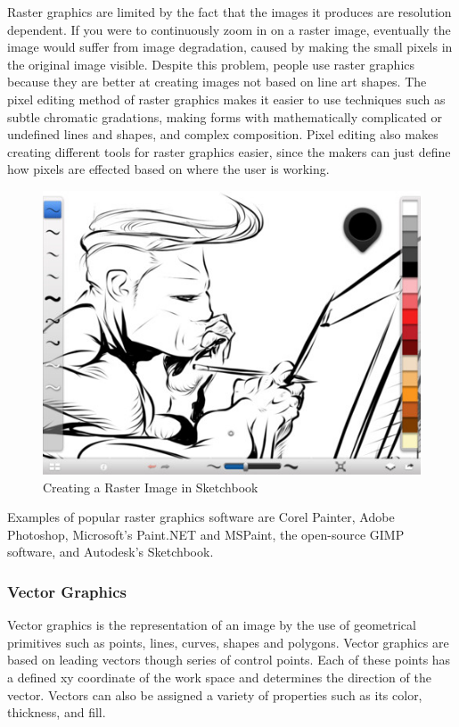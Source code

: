 \documentclass[12pt]{article}
\begin{document}
Raster graphics are limited by the fact that the images it produces are resolution dependent. 
If you were to continuously zoom in on a raster image, eventually the image would suffer from image degradation, caused by making the small pixels in the original image visible.
Despite this problem, people use raster graphics because they are better at creating images not based on line art shapes. 
The pixel editing method of raster graphics makes it easier to use techniques such as subtle chromatic gradations, making forms with mathematically complicated or undefined lines and shapes, and complex composition. 
Pixel editing also makes creating different tools for raster graphics easier, since the makers can just define how pixels are effected based on where the user is working. 
\begin{figure}
\includegraphics[width=\textwidth]{sketchbook.jpg}
\caption{Creating a Raster Image in Sketchbook}
\end{figure}



Examples of popular raster graphics software are Corel Painter, Adobe Photoshop, Microsoft's Paint.NET and MSPaint, the open-source GIMP software, and Autodesk's Sketchbook.

\pagebreak

\subsubsection{Vector Graphics}

Vector graphics is the representation of an image by the use of geometrical primitives such as points, lines, curves, shapes and polygons. 
Vector graphics are based on leading vectors though series of control points. Each of these points has a defined xy coordinate of the work space and determines the direction of the vector. 
Vectors can also be assigned a variety of properties such as its color, thickness, and fill. 
\end{document}
